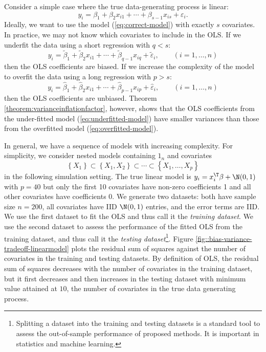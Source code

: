 Consider a simple case where the true data-generating process is linear:
\begin{equation}
y_{i}=\beta_{1}+\beta_{2}x_{i1}+\cdots+\beta_{s-1}x_{is}+\varepsilon_{i} . \label{eq:correct-model}
\end{equation}
Ideally, we want
to use the model (\ref{eq:correct-model}) with exactly $s$ covariates. In practice, we may not know which covariates to include in the OLS. 
If we underfit the data using a short regression with $q<s$: 
\begin{equation}
y_{i}=\tilde{\beta}_{1}+\tilde{\beta}_{2}x_{i1}+\cdots+\tilde{\beta}_{q-1}x_{iq}+\tilde{\varepsilon}_{i},\qquad(i=1,\ldots,n)\label{eq:underfitted-model}
\end{equation}
then the OLS coefficients are biased. If we increase the complexity of
the model to overfit the data using a long regression with $p>s$: 
\begin{equation}
y_{i}=\hat{\beta}_{1}+\hat{\beta}_{2}x_{i1}+\cdots+\hat{\beta}_{p-1}x_{ip}+\hat{\varepsilon}_{i},\qquad(i=1,\ldots,n)\label{eq:overfitted-model}
\end{equation}
then the OLS coefficients are unbiased. Theorem \ref{theorem:varianceinflationfactor},
however, shows that the OLS coefficients from the under-fitted model
(\ref{eq:underfitted-model}) have smaller variances than those from
the overfitted model (\ref{eq:overfitted-model}). 




\begin{example}\label{example::bias-variance-tradeoff}
In general, we have a sequence of models with increasing complexity.
For simplicity, we consider nested models containing $1_{n}$ and covariates
\[
\left\{ X_{1}\right\} \subset\left\{ X_{1},X_{2}\right\} \subset\cdots\subset\left\{ X_{1},\ldots,X_{p}\right\}
\]
in the following simulation setting. The true linear model is $y_i=x_i^{\T} \beta + \N(0,1)$ with $p=40$ but only the first 10 covariates have non-zero coefficients 1 and all other covariates have coefficients 0. 
We generate two datasets: both have sample size $n=200$, all covariates have IID $\N(0,1)$ entries, and the error terms are IID.
We use the first dataset to fit the OLS and thus call it the {\it training dataset}. We use the second dataset to assess the performance of the fitted OLS from the training dataset, and thus call it the {\it testing dataset}\footnote{Splitting a dataset into the training and testing datasets is a standard tool to assess the out-of-sample performance of proposed methods. It is important in statistics and machine learning.}.
Figure \ref{fig::bias-variance-tradeoff-linearmodel} plots the residual sum of squares against the number of covariates in the training and testing datasets. By definition of OLS, the residual sum of squares decreases with the number of covariates in the training dataset, but it first decreases and then increases in the testing dataset with minimum value attained at $10$, the number of covariates in the true data generating process. 
\end{example}


